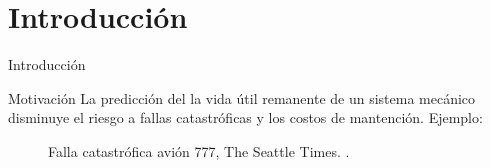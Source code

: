 \section{Introducción}

\begin{frame}{Introducción}
\begin{block}{Motivación}
La predicción del la vida útil remanente de un sistema mecánico disminuye el riesgo a fallas catastróficas y los costos de mantención. Ejemplo:
\begin{figure}
  \centering
  \qquad
  \caption{Falla catastrófica avión 777, The Seattle Times. \cite{engine777}.}
  
\end{figure}
\end{block}
\end{frame}


